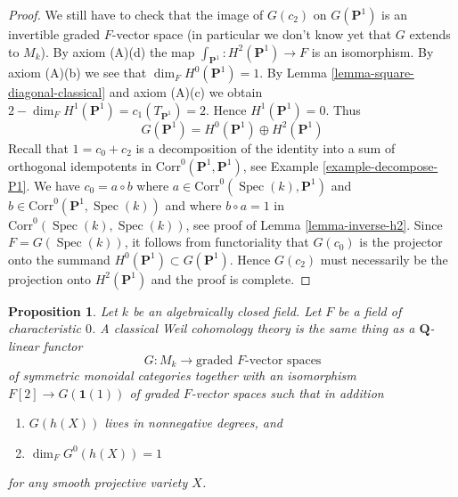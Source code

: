 \documentclass{stacks-project}
\theoremstyle{plain}
\newtheorem{proposition}[subsection]{Proposition}
\theoremstyle{definition}
\theoremstyle{remark}
\numberwithin{equation}{subsection}
\def\Spec{\mathop{\mathrm{Spec}}}
\begin{document}
\begin{proof}
\medskip\noindent
We still have to check that the image of $G(c_2)$ on $G(\mathbf{P}^1)$
is an invertible graded $F$-vector space (in particular we don't know yet
that $G$ extends to $M_k$).
By axiom (A)(d) the map $\int_{\mathbf{P}^1} : H^2(\mathbf{P}^1) \to F$
is an isomorphism. By axiom (A)(b) we see that $\dim_F H^0(\mathbf{P}^1) = 1$.
By Lemma \ref{lemma-square-diagonal-classical} and axiom (A)(c)
we obtain $2 - \dim_F H^1(\mathbf{P}^1) = c_1(T_{\mathbf{P}^1}) = 2$.
Hence $H^1(\mathbf{P}^1) = 0$. Thus
$$
G(\mathbf{P}^1) = H^0(\mathbf{P}^1) \oplus H^2(\mathbf{P}^1)
$$
Recall that $1 = c_0 + c_2$ is a decomposition of the identity
into a sum of orthogonal idempotents in
$\text{Corr}^0(\mathbf{P}^1, \mathbf{P}^1)$, see
Example \ref{example-decompose-P1}. We have $c_0 = a \circ b$ where
$a \in \text{Corr}^0(\Spec(k), \mathbf{P}^1)$ and
$b \in \text{Corr}^0(\mathbf{P}^1, \Spec(k))$ and where
$b \circ a = 1$ in $\text{Corr}^0(\Spec(k), \Spec(k))$, see proof of
Lemma \ref{lemma-inverse-h2}. Since $F = G(\Spec(k))$, it follows from
functoriality that $G(c_0)$ is the projector onto the summand
$H^0(\mathbf{P}^1) \subset G(\mathbf{P}^1)$. Hence
$G(c_2)$ must necessarily be the projection onto $H^2(\mathbf{P}^1)$
and the proof is complete.
\end{proof}

\begin{proposition}
\label{proposition-weil-cohomology-theory-classical}
Let $k$ be an algebraically closed field. Let $F$ be a field of
characteristic $0$. A classical Weil cohomology theory is the same thing
as a $\mathbf{Q}$-linear functor
$$
G : M_k \longrightarrow \text{graded }F\text{-vector spaces}
$$
of symmetric monoidal categories together with an isomorphism
$F[2] \to G(\mathbf{1}(1))$ of graded $F$-vector spaces such that
in addition
\begin{enumerate}
\item $G(h(X))$ lives in nonnegative degrees, and
\item $\dim_F G^0(h(X)) = 1$
\end{enumerate}
for any smooth projective variety $X$.
\end{proposition}
\end{document}
